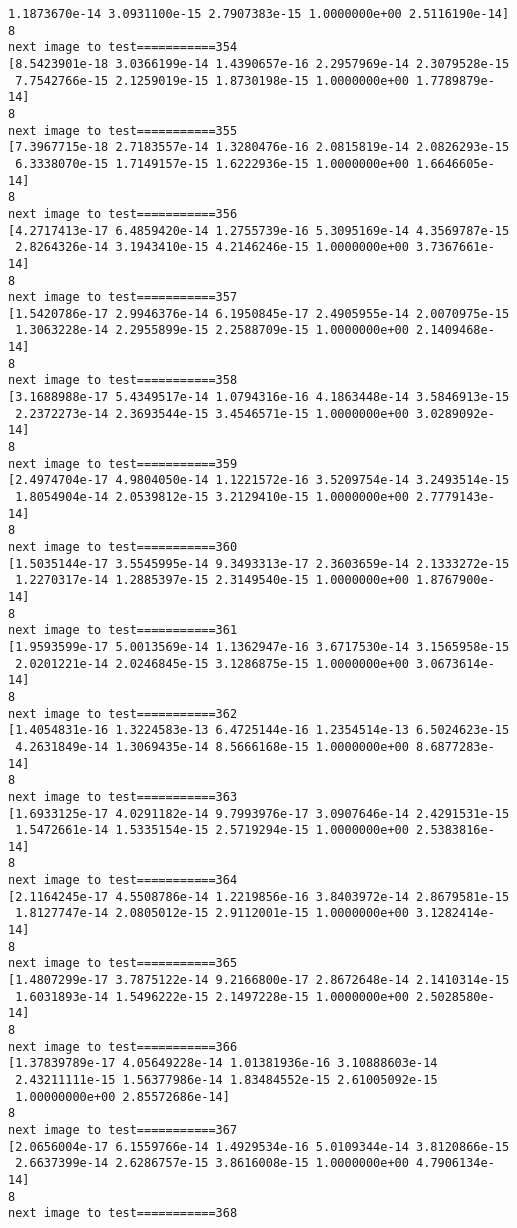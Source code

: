 \documentclass[11pt]{article}
\begin{document}
\begin{Verbatim}[commandchars=\\\{\}]
 1.1873670e-14 3.0931100e-15 2.7907383e-15 1.0000000e+00 2.5116190e-14]
8
next image to test===========354
[8.5423901e-18 3.0366199e-14 1.4390657e-16 2.2957969e-14 2.3079528e-15
 7.7542766e-15 2.1259019e-15 1.8730198e-15 1.0000000e+00 1.7789879e-14]
8
next image to test===========355
[7.3967715e-18 2.7183557e-14 1.3280476e-16 2.0815819e-14 2.0826293e-15
 6.3338070e-15 1.7149157e-15 1.6222936e-15 1.0000000e+00 1.6646605e-14]
8
next image to test===========356
[4.2717413e-17 6.4859420e-14 1.2755739e-16 5.3095169e-14 4.3569787e-15
 2.8264326e-14 3.1943410e-15 4.2146246e-15 1.0000000e+00 3.7367661e-14]
8
next image to test===========357
[1.5420786e-17 2.9946376e-14 6.1950845e-17 2.4905955e-14 2.0070975e-15
 1.3063228e-14 2.2955899e-15 2.2588709e-15 1.0000000e+00 2.1409468e-14]
8
next image to test===========358
[3.1688988e-17 5.4349517e-14 1.0794316e-16 4.1863448e-14 3.5846913e-15
 2.2372273e-14 2.3693544e-15 3.4546571e-15 1.0000000e+00 3.0289092e-14]
8
next image to test===========359
[2.4974704e-17 4.9804050e-14 1.1221572e-16 3.5209754e-14 3.2493514e-15
 1.8054904e-14 2.0539812e-15 3.2129410e-15 1.0000000e+00 2.7779143e-14]
8
next image to test===========360
[1.5035144e-17 3.5545995e-14 9.3493313e-17 2.3603659e-14 2.1333272e-15
 1.2270317e-14 1.2885397e-15 2.3149540e-15 1.0000000e+00 1.8767900e-14]
8
next image to test===========361
[1.9593599e-17 5.0013569e-14 1.1362947e-16 3.6717530e-14 3.1565958e-15
 2.0201221e-14 2.0246845e-15 3.1286875e-15 1.0000000e+00 3.0673614e-14]
8
next image to test===========362
[1.4054831e-16 1.3224583e-13 6.4725144e-16 1.2354514e-13 6.5024623e-15
 4.2631849e-14 1.3069435e-14 8.5666168e-15 1.0000000e+00 8.6877283e-14]
8
next image to test===========363
[1.6933125e-17 4.0291182e-14 9.7993976e-17 3.0907646e-14 2.4291531e-15
 1.5472661e-14 1.5335154e-15 2.5719294e-15 1.0000000e+00 2.5383816e-14]
8
next image to test===========364
[2.1164245e-17 4.5508786e-14 1.2219856e-16 3.8403972e-14 2.8679581e-15
 1.8127747e-14 2.0805012e-15 2.9112001e-15 1.0000000e+00 3.1282414e-14]
8
next image to test===========365
[1.4807299e-17 3.7875122e-14 9.2166800e-17 2.8672648e-14 2.1410314e-15
 1.6031893e-14 1.5496222e-15 2.1497228e-15 1.0000000e+00 2.5028580e-14]
8
next image to test===========366
[1.37839789e-17 4.05649228e-14 1.01381936e-16 3.10888603e-14
 2.43211111e-15 1.56377986e-14 1.83484552e-15 2.61005092e-15
 1.00000000e+00 2.85572686e-14]
8
next image to test===========367
[2.0656004e-17 6.1559766e-14 1.4929534e-16 5.0109344e-14 3.8120866e-15
 2.6637399e-14 2.6286757e-15 3.8616008e-15 1.0000000e+00 4.7906134e-14]
8
next image to test===========368

\end{Verbatim}
\end{document}
